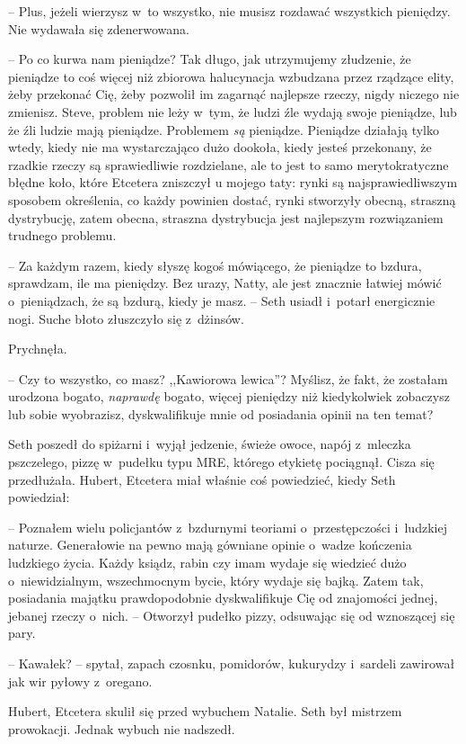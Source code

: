 \documentclass[oneside,polish,11pt,sfheadings]{mwbk}
\begin{document}
-- Plus, jeżeli wierzysz w~to wszystko, nie musisz rozdawać wszystkich
pieniędzy. Nie wydawała się zdenerwowana.

-- Po co kurwa nam pieniądze? Tak długo, jak utrzymujemy złudzenie, że
pieniądze to coś więcej niż zbiorowa halucynacja wzbudzana przez
rządzące elity, żeby przekonać Cię, żeby pozwolił im zagarnąć najlepsze
rzeczy, nigdy niczego nie zmienisz. Steve, problem nie leży w~tym, że
ludzi źle wydają swoje pieniądze, lub że źli ludzie mają pieniądze.
Problemem \textit{są} pieniądze. Pieniądze działają tylko wtedy, kiedy nie
ma wystarczająco dużo dookoła, kiedy jesteś przekonany, że rzadkie
rzeczy są sprawiedliwie rozdzielane, ale to jest to samo merytokratyczne
błędne koło, które Etcetera zniszczył u mojego taty: rynki są
najsprawiedliwszym sposobem określenia, co każdy powinien dostać, rynki
stworzyły obecną, straszną dystrybucję, zatem obecna, straszna
dystrybucja jest najlepszym rozwiązaniem trudnego problemu.

-- Za każdym razem, kiedy słyszę kogoś mówiącego, że pieniądze to bzdura,
sprawdzam, ile ma pieniędzy. Bez urazy, Natty, ale jest znacznie łatwiej
mówić o~pieniądzach, że są bzdurą, kiedy je masz. -- Seth usiadł i~potarł
energicznie nogi. Suche błoto złuszczyło się z~dżinsów.

Prychnęła. 

-- Czy to wszystko, co masz? ,,Kawiorowa lewica''? Myślisz, że
fakt, że zostałam urodzona bogato, \textit{naprawdę} bogato, więcej
pieniędzy niż kiedykolwiek zobaczysz lub sobie wyobrazisz,
dyskwalifikuje mnie od posiadania opinii na ten temat?

Seth poszedł do spiżarni i~wyjął jedzenie, świeże owoce, napój z~mleczka
pszczelego, pizzę w~pudełku typu MRE, którego etykietę pociągnął. Cisza
się przedłużała. Hubert, Etcetera miał właśnie coś powiedzieć, kiedy
Seth powiedział: 

-- Poznałem wielu policjantów z~bzdurnymi teoriami o~przestępczości i~ludzkiej naturze. Generałowie na pewno mają gówniane
opinie o~wadze kończenia ludzkiego życia. Każdy ksiądz, rabin czy imam
wydaje się wiedzieć dużo o~niewidzialnym, wszechmocnym bycie, który
wydaje się bajką. Zatem tak, posiadania majątku prawdopodobnie
dyskwalifikuje Cię od znajomości jednej, jebanej rzeczy o~nich. -- Otworzył pudełko pizzy, odsuwając się od wznoszącej się pary. 

-- Kawałek?
-- spytał, zapach czosnku, pomidorów, kukurydzy i~sardeli zawirował jak
wir pyłowy z~oregano.

Hubert, Etcetera skulił się przed wybuchem Natalie. Seth był mistrzem
prowokacji. Jednak wybuch nie nadszedł.
\end{document}
